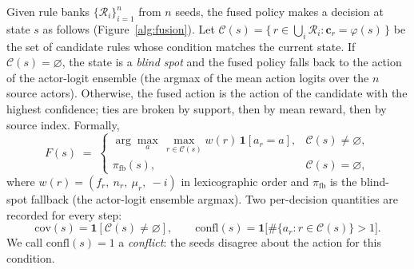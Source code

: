 \documentclass[11pt]{article}
\begin{document}
Given rule banks $\{\mathcal{R}_i\}_{i=1}^{n}$ from $n$ seeds, the fused policy makes a decision at
state $s$ as follows (Figure~\ref{alg:fusion}). Let
$\mathcal{C}(s)=\{\,r\in\textstyle\bigcup_i \mathcal{R}_i : \mathbf{c}_r=\varphi(s)\,\}$ be the set of
candidate rules whose condition matches the current state. If $\mathcal{C}(s)=\varnothing$, the
state is a \emph{blind spot} and the fused policy falls back to the action of the actor-logit ensemble
(the argmax of the mean action logits over the $n$ source actors). Otherwise, the fused action is the action
of the candidate with the highest confidence; ties are broken by support, then by mean reward, then
by source index. Formally,
\begin{equation}
F(s) \;=\; \begin{cases}
\displaystyle \arg\max_{a}\,\max_{r\in\mathcal{C}(s)} w(r)\,\mathbf{1}[a_r=a], & \mathcal{C}(s)\neq\varnothing,\\[2mm]
\pi_{\mathrm{fb}}(s), & \mathcal{C}(s)=\varnothing,
\end{cases}
\label{eq:fusion}
\end{equation}
where $w(r)=(f_r,\ n_r,\ \mu_r,\ -i)$ in lexicographic order and $\pi_{\mathrm{fb}}$ is the blind-spot
fallback (the actor-logit ensemble argmax). Two per-decision quantities are recorded for every step:
\begin{equation}
\mathrm{cov}(s)=\mathbf{1}[\mathcal{C}(s)\neq\varnothing], \qquad
\mathrm{confl}(s)=\mathbf{1}\big[\#\{a_r : r\in\mathcal{C}(s)\}>1\big].
\label{eq:coverage}
\end{equation}
We call $\mathrm{confl}(s)=1$ a \emph{conflict}: the seeds disagree about the action for this
condition.
\end{document}
